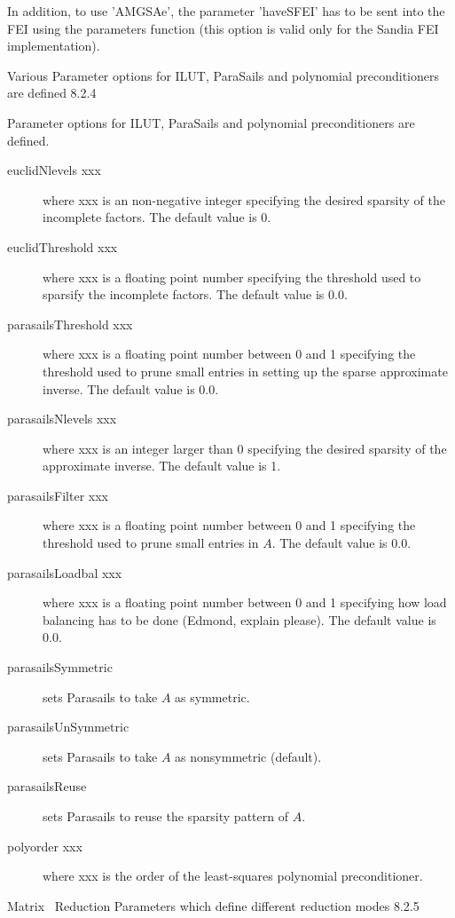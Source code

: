 \documentclass{article}
\begin{document}
\begin{cxxentry}
\begin{cxxentry}
\begin{cxxentry}
\begin{cxxdoc}
In addition, to use 'AMGSAe', the parameter 'haveSFEI' has to be sent into
the FEI using the parameters function (this option is valid only for the
Sandia FEI implementation).
\end{cxxdoc}
\end{cxxentry}
\begin{cxxentry}
{}
        {Various}
        {}
        {
Parameter options for ILUT, ParaSails and polynomial preconditioners
are defined}
        {8.2.4}
\begin{cxxdoc}

Parameter options for ILUT, ParaSails and polynomial preconditioners
are defined.

\begin{description}
\item[euclidNlevels xxx] where xxx is an non-negative integer specifying 
the desired sparsity of the incomplete factors.  The
default value is 0.
\item[euclidThreshold xxx] where xxx is a floating point number specifying 
the threshold used to sparsify the incomplete factors.  The default
value is 0.0.
\item[parasailsThreshold xxx] where xxx is a floating point number between 0 
and 1 specifying the threshold used to prune small entries
in setting up the sparse approximate inverse.  The default
value is 0.0.
\item[parasailsNlevels xxx] where xxx is an integer larger than 0 specifying 
the desired sparsity of the approximate inverse.  The
default value is 1.
\item[parasailsFilter xxx] where xxx is a floating point number between 0 
and 1 specifying the threshold used to prune small entries
in $A$.  The default value is 0.0.
\item[parasailsLoadbal xxx] where xxx is a floating point number between 0 
and 1 specifying how load balancing has to be done 
(Edmond, explain please).  The default value is 0.0.
\item[parasailsSymmetric] sets Parasails to take $A$ as symmetric.
\item[parasailsUnSymmetric] sets Parasails to take $A$ as nonsymmetric
(default).
\item[parasailsReuse] sets Parasails to reuse the sparsity pattern of $A$.
\item[polyorder xxx] where xxx is the order of the least-squares polynomial 
preconditioner.
\end{description}
\end{cxxdoc}
\end{cxxentry}
\begin{cxxentry}
{Matrix\ }
        {Reduction}
        {}
        {
Parameters which define different reduction modes}
        {8.2.5}
\begin{cxxdoc}


\end{cxxdoc}
\end{cxxentry}
\end{cxxentry}
\end{cxxentry}
\end{document}
